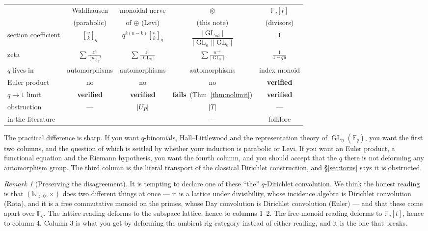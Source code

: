 \documentclass[11pt,a4paper]{article}
\theoremstyle{definition}
\theoremstyle{remark}
\newtheorem{remark}[theorem]{Remark}
\newcommand{\FF}{\mathbb{F}}
\newcommand{\NN}{\mathbb{N}}
\DeclareMathOperator{\GL}{GL}
\newcommand{\qbin}[2]{\genfrac{[}{]}{0pt}{}{#1}{#2}_{q}}
\newcommand{\norm}[1]{\lvert #1 \rvert}
\newcommand{\OK}{\textcolor{okgreen}{\textbf{verified}}}
\newcommand{\NO}{\textcolor{nored}{\textbf{fails}}}
\begin{document}
\begin{center}
\small
\setlength{\tabcolsep}{4pt}
\begin{tabular}{@{}lcccc@{}}
\toprule
& Waldhausen & monoidal nerve & $\otimes$ & $\FF_q[t]$ \\
& (parabolic) & of $\oplus$ (Levi) & (this note) & (divisors) \\
\midrule
section coefficient & $\qbin nk$ & $q^{k(n-k)}\qbin nk$ & $\dfrac{\norm{\GL_{ab}}}{\norm{\GL_a}\norm{\GL_b}}$ & $1$ \\[0.8em]
zeta & $\sum \frac{z^n}{[n]_q!}$ & $\sum \frac{z^n}{\norm{\GL_n}}$ & $\sum \frac{n^{-s}}{\norm{\GL_n}}$ & $\frac{1}{1-qu}$ \\[0.6em]
$q$ lives in & automorphisms & automorphisms & automorphisms & index monoid \\
Euler product & no & no & no & \OK \\
$q \to 1$ limit & \OK & \OK & \NO\ (Thm~\ref{thm:nolimit}) & \OK \\
obstruction & --- & $\norm{U_P}$ & $\norm{T}$ & --- \\
in the literature & \cite{GKT-comb,JoyalStreet,Dur} & \cite{GKT-comb,Morrison} & --- & folklore \\
\bottomrule
\end{tabular}
\end{center}

The practical difference is sharp. If you want $q$-binomials, Hall--Littlewood and the
representation theory of $\GL_n(\FF_q)$, you want the first two columns, and the question
of which is settled by whether your induction is parabolic or Levi. If you want an Euler
product, a functional equation and the Riemann hypothesis, you want the fourth column, and
you should accept that the $q$ there is not deforming any automorphism group. The third
column is the literal transport of the classical Dirichlet construction, and
\S\ref{sec:torus} says it is obstructed.

\begin{remark}[Preserving the disagreement]
It is tempting to declare one of these ``the'' $q$-Dirichlet convolution. We think the
honest reading is that $(\NN_{>0},\times)$ does two different things at once --- it is a
lattice under divisibility, whose incidence algebra is Dirichlet convolution (Rota), and
it is a free commutative monoid on the primes, whose Day convolution is Dirichlet
convolution (Euler) --- and that these come apart over $\FF_q$. The lattice reading
deforms to the subspace lattice, hence to columns 1--2. The free-monoid reading deforms to
$\FF_q[t]$, hence to column 4. Column 3 is what you get by deforming the ambient rig
category instead of either reading, and it is the one that breaks.
\end{remark}
\end{document}
